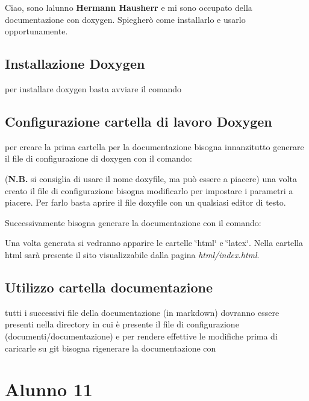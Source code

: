Ciao, sono l\textquotesingle{}alunno {\bfseries{Hermann Hausherr}} e mi sono occupato della documentazione con doxygen. Spiegherò come installarlo e usarlo opportunamente. \subsection*{Installazione Doxygen}

per installare doxygen basta avviare il comando 
\begin{DoxyCode}{0}
\end{DoxyCode}
 \subsection*{Configurazione cartella di lavoro Doxygen}

per creare la prima cartella per la documentazione bisogna innanzitutto generare il file di configurazione di doxygen con il comando\+: 
\begin{DoxyCode}{0}
\end{DoxyCode}
 ({\bfseries{N.\+B.}} si consiglia di usare il nome doxyfile, ma può essere a piacere) una volta creato il file di configurazione bisogna modificarlo per impostare i parametri a piacere. Per farlo basta aprire il file doxyfile con un qualsiasi editor di testo.

Successivamente bisogna generare la documentazione con il comando\+: 
\begin{DoxyCode}{0}
\end{DoxyCode}
 Una volta generata si vedranno apparire le cartelle \char`\"{}html\char`\"{} e \char`\"{}latex\char`\"{}. Nella cartella html sarà presente il sito visualizzabile dalla pagina {\itshape html/index.\+html}. \subsection*{Utilizzo cartella documentazione}

tutti i successivi file della documentazione (in markdown) dovranno essere presenti nella directory in cui è presente il file di configurazione (documenti/documentazione) e per rendere effettive le modifiche prima di caricarle su git bisogna rigenerare la documentazione con 
\begin{DoxyCode}{0}
\end{DoxyCode}
 \section*{Alunno 11}

